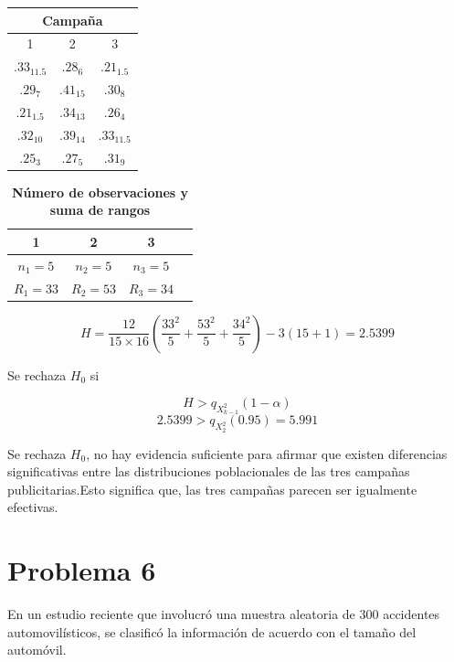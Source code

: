 \documentclass{article}
\begin{document}
\begin{center}
    \begin{tabular}{c |c |c}
        \multicolumn{3}{c}{Campaña}              \\
        \hline
        1            & 2          & 3            \\
        $.33_{11.5}$ & $.28_{6}$  & $.21_{1.5}$  \\
        $.29_{7}$    & $.41_{15}$ & $.30_{8}$    \\
        $.21_{1.5}$  & $.34_{13}$ & $.26_{4}$    \\
        $.32_{10}$   & $.39_{14}$ & $.33_{11.5}$ \\
        $.25_{3}$    & $.27_{5}$  & $.31_{9}$    \\
    \end{tabular}
\end{center}

\begin{table}[ht]
    \centering
    \caption{\textbf{Número de observaciones y suma de rangos}}
    \begin{tabular}{cccc}
        \toprule
        1          & 2          & 3          \\
        \midrule
        $n_1 = 5$  & $n_2 = 5$  & $n_3 = 5$  \\
        $R_1 = 33$ & $R_2 = 53$ & $R_3 = 34$ \\
        \bottomrule
    \end{tabular}
\end{table}

\[ H = \frac{12}{15 \times 16} \left(\frac{33^2}{5} + \frac{53^2}{5} + \frac{34^2}{5} \right) - 3(15 + 1) = 2.5399 \]

Se rechaza $H_0$ si

\[H > q_{X^{2}_{k-1}}(1 - \alpha)\]
\[2.5399 > q_{X^{2}_{2}}(0.95) = 5.991\]

Se rechaza \(H_0\), no hay evidencia suficiente para afirmar que existen diferencias significativas entre las distribuciones poblacionales de las tres campañas publicitarias.Esto significa que, las tres campañas parecen ser igualmente efectivas.

\section{Problema 6}
En un estudio reciente que involucró una muestra aleatoria de 300 accidentes automovilísticos, se clasificó la información de acuerdo con el tamaño del automóvil.
\end{document}
